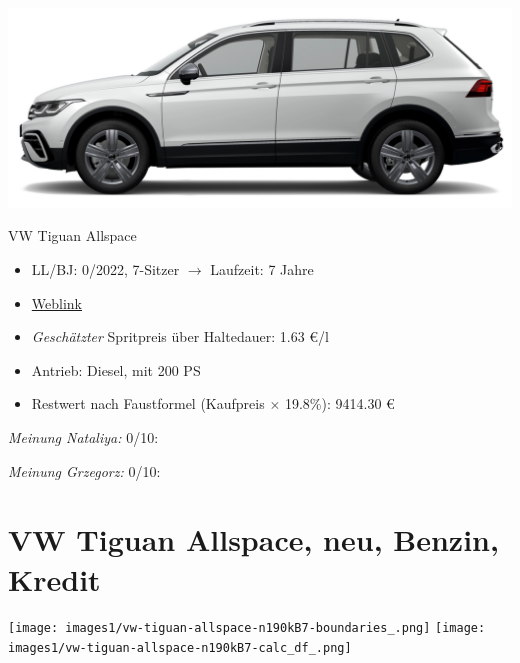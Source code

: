 \documentclass[landscape, DIV=99, 14pt]{scrartcl}
\begin{document}
\pagebreak
\begin{center}
\includegraphics[width=0.9\columnwidth]{cars/vw-tiguan-diesel.png}

VW Tiguan Allspace
\end{center}

\begin{itemize}
    \item LL/BJ: 0/2022, 7-Sitzer $\rightarrow$ Laufzeit: 7 Jahre
    \item \href{https://www.volkswagen.de/de/konfigurator.html/__app/der-neue-tiguan-allspace/der-tiguan-allspace---standardmodelle/elegance.app?buildabilityStatus-app=buildable&category-app=private&carlineId-app=31160&salesGroupId-app=32700&trimName-app=Elegance&modelId-app=BJ247T%24GYORYOR&modelVersion-app=2&modelYear-app=2022&exteriorId-app=F14+0Q0Q&interiorId-app=F56+++++BG&options-app=GWBAWBA-GPG4PG4-MAHV1M6-GPFCPFC-GRBDRBD-MKSUKA2}{Weblink}
    \item \emph{Gesch\"atzter} Spritpreis \"uber Haltedauer: 1.63 \euro{}/l
    \item Antrieb: Diesel, mit 200 PS
    \item Restwert nach Faustformel (Kaufpreis $\times$ 19.8\%): 9414.30 \euro{}
\end{itemize}

\begin{small}
\emph{Meinung Nataliya:} 0/10: 
        
\emph{Meinung Grzegorz:} 0/10: 
\end{small}

\pagebreak


\twocolumn

\section*{VW Tiguan Allspace, neu, Benzin, Kredit}
\begin{center}
\texttt{[image: images1/vw-tiguan-allspace-n190kB7-boundaries\_.png]}
\null
\vspace{0.5cm}
\texttt{[image: images1/vw-tiguan-allspace-n190kB7-calc\_df\_.png]}
\end{center}
\end{document}
